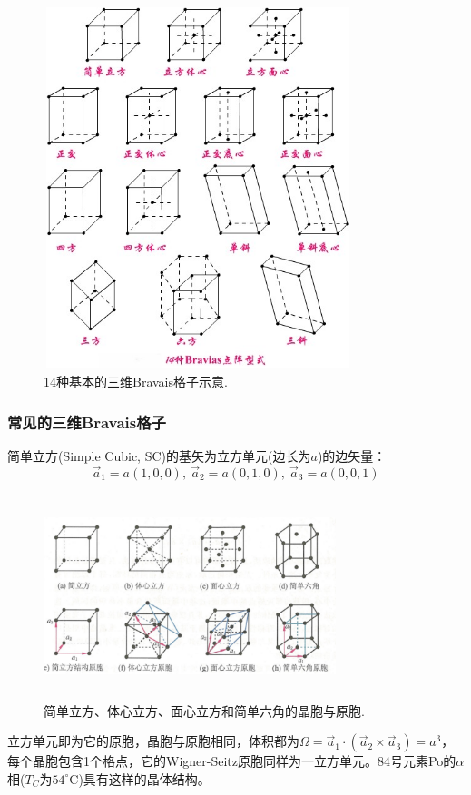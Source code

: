 \begin{figure}[h!]
\centering
\vspace*{-0.05in}
\includegraphics[height=4.15in,width=3.55in,viewport=0 25 487 581,clip]{Figures/Bravais_Lattice-3D.jpg}
\caption{\small \textrm{14种基本的三维Bravais格子示意.}}%
\label{Fig:Lattice_Type-3D}
\end{figure}

\subsubsection{常见的三维Bravais格子}
{\heiti 简单立方(Simple Cubic, SC)}的基矢为立方单元(边长为$a$)的边矢量：
\begin{displaymath}
\vec a_1=a(1,0,0),~\vec a_2=a(0,1,0),~\vec a_3=a(0,0,1)
\end{displaymath} 
\begin{figure}[h!]
\centering
\vspace*{-0.05in}
\includegraphics[height=2.35in,width=3.35in,viewport=0 0 85 60,clip]{Figures/Bravais_Lattice.png}
\caption{\small \textrm{简单立方、体心立方、面心立方和简单六角的晶胞与原胞.}}%
\label{Fig:Bravais_Lattice-1}
\end{figure}
立方单元即为它的原胞，晶胞与原胞相同，体积都为$\Omega=\vec a_1\cdot(\vec a_2\times\vec a_3)=a^3$，每个晶胞包含1个格点，它的Wigner-Seitz原胞同样为一立方单元。84号元素Po的$\alpha$相($T_C$为$54^{\circ}\mathrm{C}$)具有这样的晶体结构。

